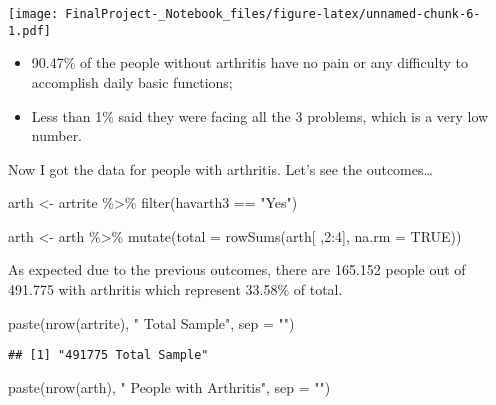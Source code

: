 \documentclass[
]{article}
\newenvironment{Shaded}{\begin{snugshade}}{\end{snugshade}}
\newcommand{\AttributeTok}[1]{\textcolor[rgb]{0.77,0.63,0.00}{#1}}
\newcommand{\ConstantTok}[1]{\textcolor[rgb]{0.00,0.00,0.00}{#1}}
\newcommand{\DecValTok}[1]{\textcolor[rgb]{0.00,0.00,0.81}{#1}}
\newcommand{\FunctionTok}[1]{\textcolor[rgb]{0.00,0.00,0.00}{#1}}
\newcommand{\NormalTok}[1]{#1}
\newcommand{\OtherTok}[1]{\textcolor[rgb]{0.56,0.35,0.01}{#1}}
\newcommand{\SpecialCharTok}[1]{\textcolor[rgb]{0.00,0.00,0.00}{#1}}
\newcommand{\StringTok}[1]{\textcolor[rgb]{0.31,0.60,0.02}{#1}}
\providecommand{\tightlist}{%
  \setlength{\itemsep}{0pt}\setlength{\parskip}{0pt}}
\begin{document}
\texttt{[image: FinalProject-\_Notebook\_files/figure-latex/unnamed-chunk-6-1.pdf]}

\begin{itemize}
\tightlist
\item
  90.47\% of the people without arthritis have no pain or any difficulty
  to accomplish daily basic functions;
\item
  Less than 1\% said they were facing all the 3 problems, which is a
  very low number.
\end{itemize}

Now I got the data for people with arthritis. Let's see the
outcomes\ldots{}

\begin{Shaded}
\begin{Highlighting}[]
\NormalTok{arth }\OtherTok{\textless{}{-}}\NormalTok{ artrite }\SpecialCharTok{\%\textgreater{}\%} 
  \FunctionTok{filter}\NormalTok{(havarth3 }\SpecialCharTok{==} \StringTok{"Yes"}\NormalTok{) }

\NormalTok{arth }\OtherTok{\textless{}{-}}\NormalTok{ arth }\SpecialCharTok{\%\textgreater{}\%} \FunctionTok{mutate}\NormalTok{(}\AttributeTok{total =} \FunctionTok{rowSums}\NormalTok{(arth[ ,}\DecValTok{2}\SpecialCharTok{:}\DecValTok{4}\NormalTok{], }\AttributeTok{na.rm =} \ConstantTok{TRUE}\NormalTok{))}
\end{Highlighting}
\end{Shaded}

As expected due to the previous outcomes, there are 165.152 people out
of 491.775 with arthritis which represent 33.58\% of total.

\begin{Shaded}
\begin{Highlighting}[]
\FunctionTok{paste}\NormalTok{(}\FunctionTok{nrow}\NormalTok{(artrite), }\StringTok{" Total Sample"}\NormalTok{, }\AttributeTok{sep =} \StringTok{""}\NormalTok{)}
\end{Highlighting}
\end{Shaded}

\begin{verbatim}
## [1] "491775 Total Sample"
\end{verbatim}

\begin{Shaded}
\begin{Highlighting}[]
\FunctionTok{paste}\NormalTok{(}\FunctionTok{nrow}\NormalTok{(arth), }\StringTok{" People with Arthritis"}\NormalTok{, }\AttributeTok{sep =} \StringTok{""}\NormalTok{)}
\end{Highlighting}
\end{Shaded}
\end{document}

